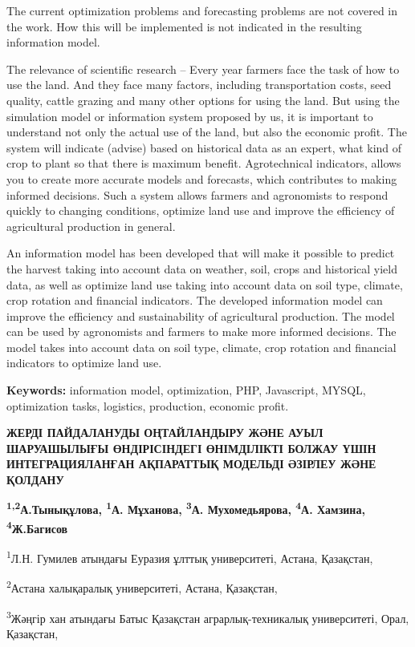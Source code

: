 The current optimization problems and forecasting problems are not
covered in the work. How this will be implemented is not indicated in
the resulting information model.

The relevance of scientific research -- Every year farmers face the task
of how to use the land. And they face many factors, including
transportation costs, seed quality, cattle grazing and many other
options for using the land. But using the simulation model or
information system proposed by us, it is important to understand not
only the actual use of the land, but also the economic profit. The
system will indicate (advise) based on historical data as an expert,
what kind of crop to plant so that there is maximum benefit.
Agrotechnical indicators, allows you to create more accurate models and
forecasts, which contributes to making informed decisions. Such a system
allows farmers and agronomists to respond quickly to changing
conditions, optimize land use and improve the efficiency of agricultural
production in general.

An information model has been developed that will make it possible to
predict the harvest taking into account data on weather, soil, crops and
historical yield data, as well as optimize land use taking into account
data on soil type, climate, crop rotation and financial indicators. The
developed information model can improve the efficiency and
sustainability of agricultural production. The model can be used by
agronomists and farmers to make more informed decisions. The model takes
into account data on soil type, climate, crop rotation and financial
indicators to optimize land use.

\textbf{Keywords:} information model, optimization, PHP, Javascript,
MYSQL, optimization tasks, logistics, production, economic profit.

\textbf{ЖЕРДІ ПАЙДАЛАНУДЫ ОҢТАЙЛАНДЫРУ ЖӘНЕ АУЫЛ ШАРУАШЫЛЫҒЫ
ӨНДІРІСІНДЕГІ ӨНІМДІЛІКТІ БОЛЖАУ ҮШІН ИНТЕГРАЦИЯЛАНҒАН АҚПАРАТТЫҚ
МОДЕЛЬДІ ӘЗІРЛЕУ ЖӘНЕ ҚОЛДАНУ}

\textbf{\textsuperscript{1,2}А.Тынықұлова, \textsuperscript{1}А.
Мұханова, \textsuperscript{3}А. Мухомедьярова, \textsuperscript{4}А.
Хамзина, \textsuperscript{4}Ж.Багисов}

\textsuperscript{1}Л.Н. Гумилев атындағы Еуразия ұлттық университеті,
Астана, Қазақстан,

\textsuperscript{2}Астана халықаралық университеті, Астана, Қазақстан,

\textsuperscript{3}Жәңгір хан атындағы Батыс Қазақстан
аграрлық-техникалық университеті, Орал, Қазақстан,


